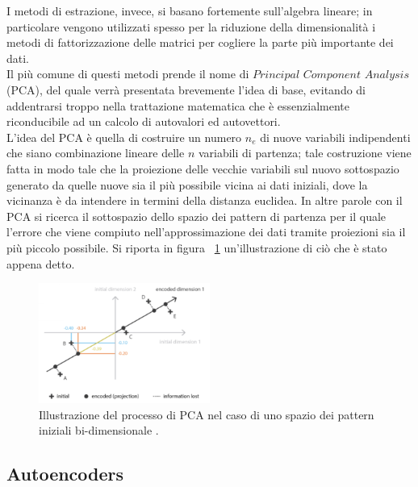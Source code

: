 I metodi di estrazione, invece, si basano fortemente sull'algebra lineare; in particolare vengono utilizzati spesso per la riduzione della dimensionalità i metodi di fattorizzazione delle matrici per cogliere la parte più importante dei dati. \\
Il più comune di questi metodi prende il nome di $\textit{Principal Component Analysis}$ (PCA), del quale verrà presentata brevemente l'idea di base, evitando di addentrarsi troppo nella trattazione matematica che è essenzialmente riconducibile ad un calcolo di autovalori ed autovettori. \\
L'idea del PCA è quella di costruire un numero $\textit{n}_\textit{e}$ di nuove variabili indipendenti che siano combinazione lineare delle $\textit{n}$ variabili di partenza; tale costruzione viene fatta in modo tale che la proiezione delle vecchie variabili sul nuovo sottospazio generato da quelle nuove sia il più possibile vicina ai dati iniziali, dove la vicinanza è da intendere in termini della distanza euclidea. In altre parole con il PCA si ricerca il sottospazio dello spazio dei pattern di partenza per il quale l'errore che viene compiuto nell'approssimazione dei dati tramite proiezioni sia il più piccolo possibile. Si riporta in figura ~\ref{PCA} un'illustrazione di ciò che è stato appena detto.
\\
\begin{figure}[h!]
	\centering
	\includegraphics[width=0.50\textwidth]{figs/PCA.png}
	\caption{Illustrazione del processo di PCA nel caso di uno spazio dei pattern iniziali bi-dimensionale \cite{Understanding_VAEs}.}
	\label{PCA}
\end{figure}

\newpage

\subsection{Autoencoders}


